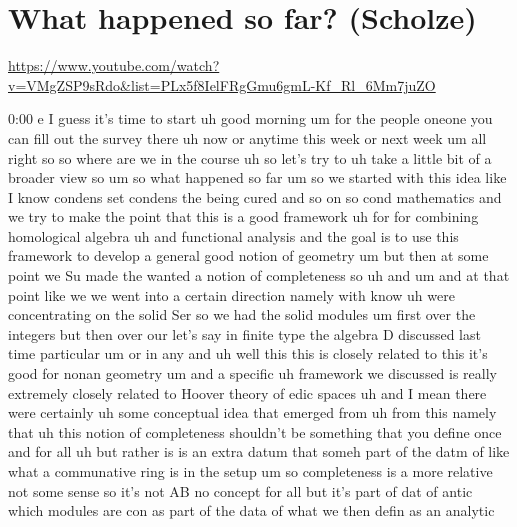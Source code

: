 
\section{\ufs What happened so far? (Scholze)}

\url{https://www.youtube.com/watch?v=VMgZSP9sRdo&list=PLx5f8IelFRgGmu6gmL-Kf_Rl_6Mm7juZO}
\renewcommand{\yt}[2]{\href{https://www.youtube.com/watch?v=VMgZSP9sRdo&list=PLx5f8IelFRgGmu6gmL-Kf_Rl_6Mm7juZO&t=#1}{#2}}
\vspace{1em}

\begin{unfinished}{0:00}
e
I  guess  it's  time  to  start  uh  good
morning  um  for  the  people  oneone  you  can
fill  out  the  survey  there  uh  now  or
anytime  this  week  or  next  week
um  all  right  so  so  where  are  we  in  the
course  uh  so  let's  try  to  uh  take  a
little  bit  of  a  broader  view  so
um  so  what  happened  so
far
um  so  we  started  with  this  idea  like  I
know  condens  set  condens  the  being  cured
and  so  on
so  cond  mathematics  and  we  try  to  make
the  point  that  this  is  a  good
framework  uh
for  for  combining  homological
algebra  uh  and  functional
analysis
and  the  goal  is  to  use  this  framework  to
develop  a  general  good  notion  of
geometry
um  but  then  at  some  point  we  Su  made  the
wanted  a  notion  of  completeness  so
uh
and
um  and  at  that  point  like  we  we  went
into  a  certain  direction  namely  with
know  uh  were  concentrating  on  the  solid
Ser  so  we  had  the  solid
modules
um  first  over  the  integers  but  then  over
our  let's  say  in  finite
type  the  algebra  D  discussed  last  time
particular  um  or  in
any
and  uh  well  this  this  is  closely  related
to
this  it's  good  for  nonan
geometry  um  and  a
specific  uh  framework  we  discussed  is
really  extremely  closely  related  to
Hoover  theory  of  edic
spaces  uh  and  I  mean  there  were
certainly  uh  some  conceptual  idea  that
emerged  from  uh  from  this  namely  that  uh
this  notion  of  completeness  shouldn't  be
something  that  you  define  once  and  for
all  uh  but  rather  is  is  an  extra  datum
that  someh  part  of  the  datm  of  like  what
a  communative  ring  is  in  the  setup
um  so
completeness  is  a  more  relative
not  some  sense  so
it's  not  AB  no  concept  for  all  but  it's
part  of  dat  of
antic  which  modules  are  con  as  part  of
the  data  of  what
we  then  defin  as  an
analytic

\end{unfinished}
